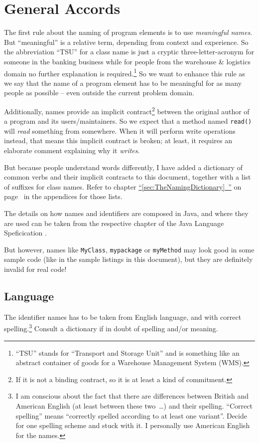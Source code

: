 \documentclass[11pt,a4paper, titlepage, parskip=half, headsepline, footsepline, cleardoublepage=current, headheight=1cm]{scrbook}
\newcommand*{\tqfullvref}[1]{\hyperref[{#1}]{“\ref*{#1}~\nameref*{#1}”} on page~\pageref{#1}}
\begin{document}
\section{General Accords}
The first rule about the naming of program elements is to use \textit{meaningful names}. But “meaningful” is a relative term, depending from context and experience. So the abbreviation “TSU” for a class name is just a cryptic three-letter-acronym for someone in the banking business while for people from the warehouse \& logistics domain no further explanation is required.\footnote{“TSU” stands for “Transport and Storage Unit” and is something like an abstract container of goods for a Warehouse Management System (WMS).} So we want to enhance this rule as we say that the name of a program element has to be meaningful for as many people as possible – even outside the current problem domain.

Additionally, names provide an implicit contract\footnote{If it is not a binding contract, so it is at least a kind of commitment.} between the original author of a program and its users/maintainers. So we expect that a method named \lstinline|read()| will \textit{read} something from somewhere. When it will perform write operations instead, that means this implicit contract is broken; at least, it requires an elaborate comment explaining why it \textit{writes}.

But because people understand words differently, I have added a dictionary of common verbs and their implicit contracts to this document, together with a list of suffixes for class names. Refer to chapter \tqfullvref{sec:TheNamingDictionary} in the appendices for those lists.

The details on how names and identifiers are composed in Java, and where they are used can be taken from the respective chapter of the Java Language Speficication \autocite{ORACLE_DOC_LANGUAGE_SPECIFICATION:NamesAndIdentifiers}.

But however, names like \lstinline|MyClass|, \lstinline|mypackage| or \lstinline|myMethod| may look good in some sample code (like in the sample listings in this document), but they are definitely invalid for real code!

\subsection{Language}
The identifier names has to be taken from English language, and with correct spelling.\footnote{I am conscious about the fact that there are differences between British and American English (at least between these two~…) and their spelling. “Correct spelling” means “correctly spelled according to at least one variant”. Decide for one spelling scheme and stuck with it. I personally use American English for the names.} Consult a dictionary if in doubt of spelling and/or meaning.
\end{document}

